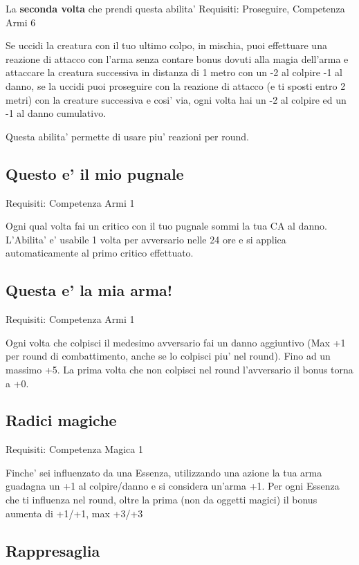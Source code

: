 \documentclass[a4paper,11pt,twoside,openany]{book}
\begin{document}
La \textbf{seconda volta} che prendi questa abilita' Requisiti: Proseguire, Competenza Armi 6

Se uccidi la creatura con il tuo ultimo colpo, in mischia, puoi effettuare una reazione di attacco con l'arma senza contare bonus dovuti alla magia dell'arma e attaccare la creatura successiva in distanza di 1 metro con un -2 al colpire -1 al danno, se la uccidi puoi proseguire con la reazione di attacco (e ti sposti entro 2 metri) con la creature successiva e cosi' via, ogni volta hai un -2 al colpire ed un -1 al danno cumulativo.

Questa abilita' permette di usare piu' reazioni per round.

\subsection{Questo e' il mio pugnale}

Requisiti: Competenza Armi 1

Ogni qual volta fai un critico con il tuo pugnale sommi la tua CA al danno. L'Abilita' e' usabile 1 volta per avversario nelle 24 ore e si applica automaticamente al primo critico effettuato.

\subsection{Questa e' la mia arma!}

Requisiti: Competenza Armi 1

Ogni volta che colpisci il medesimo avversario fai un danno aggiuntivo (Max +1 per round di combattimento, anche se lo colpisci piu' nel round). Fino ad un massimo +5. La prima volta che non colpisci nel round l'avversario il bonus torna a +0.

\subsection{Radici magiche}

Requisiti: Competenza Magica 1

Finche' sei influenzato da una Essenza, utilizzando una azione la tua arma guadagna un +1 al colpire/danno e si considera un'arma +1. Per ogni Essenza che ti influenza nel round, oltre la prima (non da oggetti magici) il bonus aumenta di +1/+1, max +3/+3

\subsection{Rappresaglia}
\end{document}
